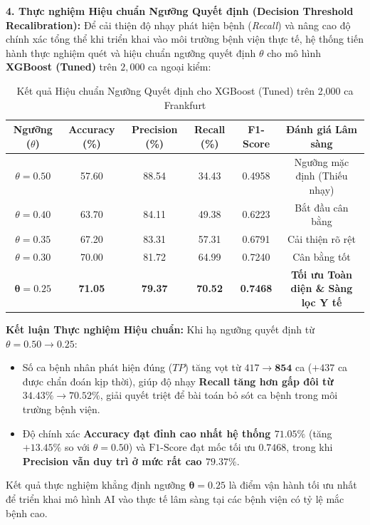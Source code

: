 \documentclass[12pt,a4paper]{report}
\begin{document}
\textbf{4. Thực nghiệm Hiệu chuẩn Ngưỡng Quyết định (Decision Threshold Recalibration):}
Để cải thiện độ nhạy phát hiện bệnh (\textit{Recall}) và nâng cao độ chính xác tổng thể khi triển khai vào môi trường bệnh viện thực tế, hệ thống tiến hành thực nghiệm quét và hiệu chuẩn ngưỡng quyết định $\theta$ cho mô hình \textbf{XGBoost (Tuned)} trên $2,000$ ca ngoại kiểm:

\begin{table}[H]
\centering
\small
\begin{tabular}{cccccc}
\toprule
\textbf{Ngưỡng ($\theta$)} & \textbf{Accuracy (\%)} & \textbf{Precision (\%)} & \textbf{Recall (\%)} & \textbf{F1-Score} & \textbf{Đánh giá Lâm sàng} \\
\midrule
$\theta = 0.50$ & 57.60 & 88.54 & 34.43 & 0.4958 & Ngưỡng mặc định (Thiếu nhạy) \\
$\theta = 0.40$ & 63.70 & 84.11 & 49.38 & 0.6223 & Bắt đầu cân bằng \\
$\theta = 0.35$ & 67.20 & 83.31 & 57.31 & 0.6791 & Cải thiện rõ rệt \\
$\theta = 0.30$ & 70.00 & 81.72 & 64.99 & 0.7240 & Cân bằng tốt \\
$\mathbf{\theta = 0.25}$ & \textbf{71.05} & \textbf{79.37} & \textbf{70.52} & \textbf{0.7468} & \textbf{Tối ưu Toàn diện \& Sàng lọc Y tế} \\
\bottomrule
\end{tabular}
\caption{Kết quả Hiệu chuẩn Ngưỡng Quyết định cho XGBoost (Tuned) trên 2,000 ca Frankfurt}
\label{tab:threshold_tuning}
\end{table}

\textbf{Kết luận Thực nghiệm Hiệu chuẩn:} Khi hạ ngưỡng quyết định từ $\theta = 0.50 \to \mathbf{0.25}$:
\begin{itemize}[leftmargin=1.5em]
    \item Số ca bệnh nhân phát hiện đúng ($TP$) tăng vọt từ $417 \to \mathbf{854}$ ca ($+437$ ca được chẩn đoán kịp thời), giúp độ nhạy \textbf{Recall tăng hơn gấp đôi từ $34.43\% \to \mathbf{70.52\%}$}, giải quyết triệt để bài toán bỏ sót ca bệnh trong môi trường bệnh viện.
    \item Độ chính xác \textbf{Accuracy đạt đỉnh cao nhất hệ thống $\mathbf{71.05\%}$} (tăng $+13.45\%$ so với $\theta=0.50$) và $\text{F1-Score}$ đạt mốc tối ưu $\mathbf{0.7468}$, trong khi \textbf{Precision vẫn duy trì ở mức rất cao $79.37\%$}.
\end{itemize}
Kết quả thực nghiệm khẳng định ngưỡng $\mathbf{\theta = 0.25}$ là điểm vận hành tối ưu nhất để triển khai mô hình AI vào thực tế lâm sàng tại các bệnh viện có tỷ lệ mắc bệnh cao.
\end{document}
